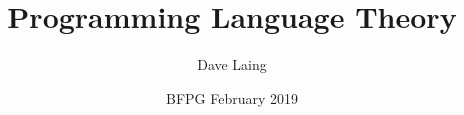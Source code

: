 \documentclass[center,aspectratio=169]{beamer}
\title{Programming Language Theory}
\author{Dave Laing}
\date{BFPG February 2019}
\begin{document}
\begin{frame}
\maketitle
\end{frame}


















\end{document}
